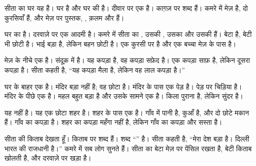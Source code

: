 \documentclass[12pt]{nextbook}
\begin{document}
\begin{readersection}{सीता का घर}
यह    है। घर  है और घर की   है। दीवार पर एक   है। काग़ज़ पर  शब्द हैं। कमरे में मेज़ है, दो कुरसियाँ हैं, और मेज़ पर पुस्तक, , क़लम और  हैं।

घर का   है। दरवाज़े पर एक  आदमी  है। कमरे में सीता का , उसकी , उसका  और उसकी  हैं। बेटा  है, बेटी भी छोटी है। भाई बड़ा है, लेकिन बहन छोटी है। एक  कुरसी पर है और एक बच्चा मेज़ के पास है।

मेज़ के नीचे एक  है। संदूक़ में  है। यह कपड़ा  है, वह कपड़ा सफ़ेद है। एक कपड़ा साफ़ है, लेकिन दूसरा कपड़ा  है। सीता कहती है, “यह कपड़ा  मैला है, लेकिन वह लाल कपड़ा  है।”

घर के बाहर एक   है। मंदिर बड़ा नहीं है; वह छोटा है। मंदिर के पास एक  पेड़ है। पेड़ पर चिड़िया है। मंदिर के पीछे एक  है। महल बहुत बड़ा है और उसके सामने एक  है। किला पुराना है, लेकिन सुंदर है।

यह   नहीं है। यह एक छोटा शहर है। शहर के पास एक  है। गाँव में पानी है, कुआँ है, और दो छोटे मकान हैं। गाँव का कपड़ा  है। शहर का कपड़ा महँगा नहीं है, लेकिन गाँव का कपड़ा और सस्ता है।

 सीता की किताब देखता हूँ। किताब पर  शब्द हैं।  शब्द “” है। सीता कहती है, “मेरा देश बड़ा है। दिल्ली भारत की राजधानी है।” कमरे में सब लोग सुनते हैं। सीता का बेटा मेज़ पर पेंसिल रखता है, बेटी किताब खोलती है, और  दरवाज़े पर खड़ा है।
\end{readersection}
\end{document}
